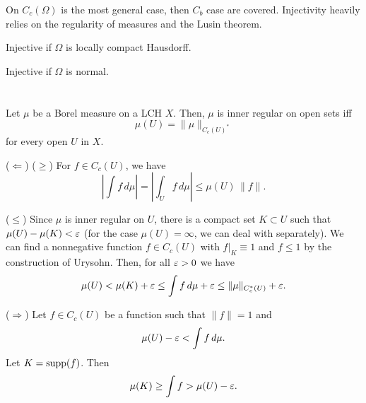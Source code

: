 \documentclass{../note}
\begin{document}
\begin{prb}
On $C_c(\Omega)$ is the most general case, then $C_b$ case are covered.
Injectivity heavily relies on the regularity of measures and the Lusin theorem.
\begin{parts}
\item Injective if $\Omega$ is locally compact Hausdorff.
\item Injective if $\Omega$ is normal.
\end{parts}
\end{prb}



\begin{prb}
\end{prb}














\section{}


\begin{lem}
Let $\mu$ be a Borel measure on a LCH $X$.
Then, $\mu$ is inner regular on open sets iff
\[\mu(U)=\|\mu\|_{C_c(U)^*}\]
for every open $U$ in $X$.
\end{lem}
\begin{pf}
($\Leftarrow$)
($\ge$)
For $f\in C_c(U)$, we have
\[|\int f\,d\mu|=|\int_Uf\,d\mu|\le\mu(U)\,\|f\|.\]

($\le$)
Since $\mu$ is inner regular on $U$, there is a compact set $K\subset U$ such that $\mu(U)-\mu(K)<\varepsilon$ (for the case $\mu(U)=\infty$, we can deal with separately).
We can find a nonnegative function $f\in C_c(U)$ with $f|_K \equiv 1$ and $f\le1$ by the construction of Urysohn.
Then, for all $\varepsilon>0$ we have
\[\mu(U)<\mu(K)+\varepsilon\le\int f\,d\mu+\varepsilon\le\|\mu\|_{C_c^*(U)}+\varepsilon.\]

($\Rightarrow$)
Let $f\in C_c(U)$ be a function such that $\|f\|=1$ and
\[\mu(U)-\varepsilon<\int f\,d\mu.\]
Let $K=\operatorname{supp}(f)$.
Then
\[\mu(K)\ge\int f>\mu(U)-\varepsilon.\]
\end{pf}
\end{document}
